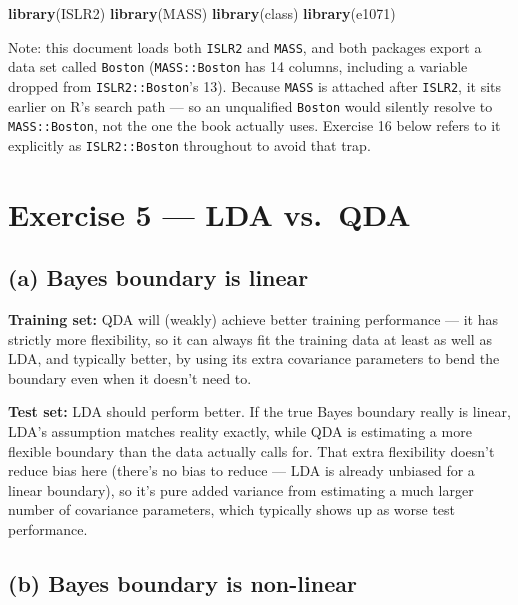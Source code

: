 \documentclass[
  11pt,
]{article}
\author{}
\date{\vspace{-2.5em}}
\newenvironment{Shaded}{\begin{snugshade}}{\end{snugshade}}
\newcommand{\FunctionTok}[1]{\textcolor[rgb]{0.13,0.29,0.53}{\textbf{#1}}}
\newcommand{\NormalTok}[1]{#1}
\begin{document}

\begin{Shaded}
\begin{Highlighting}[]
\FunctionTok{library}\NormalTok{(ISLR2)}
\FunctionTok{library}\NormalTok{(MASS)}
\FunctionTok{library}\NormalTok{(class)}
\FunctionTok{library}\NormalTok{(e1071)}
\end{Highlighting}
\end{Shaded}

Note: this document loads both \texttt{ISLR2} and \texttt{MASS}, and
both packages export a data set called \texttt{Boston}
(\texttt{MASS::Boston} has 14 columns, including a variable dropped from
\texttt{ISLR2::Boston}'s 13). Because \texttt{MASS} is attached after
\texttt{ISLR2}, it sits earlier on R's search path --- so an unqualified
\texttt{Boston} would silently resolve to \texttt{MASS::Boston}, not the
one the book actually uses. Exercise 16 below refers to it explicitly as
\texttt{ISLR2::Boston} throughout to avoid that trap.

\section{Exercise 5 --- LDA vs.~QDA}\label{exercise-5-lda-vs.-qda}

\subsection{(a) Bayes boundary is
linear}\label{a-bayes-boundary-is-linear}

\textbf{Training set:} QDA will (weakly) achieve better training
performance --- it has strictly more flexibility, so it can always fit
the training data at least as well as LDA, and typically better, by
using its extra covariance parameters to bend the boundary even when it
doesn't need to.

\textbf{Test set:} LDA should perform better. If the true Bayes boundary
really is linear, LDA's assumption matches reality exactly, while QDA is
estimating a more flexible boundary than the data actually calls for.
That extra flexibility doesn't reduce bias here (there's no bias to
reduce --- LDA is already unbiased for a linear boundary), so it's pure
added variance from estimating a much larger number of covariance
parameters, which typically shows up as worse test performance.

\subsection{(b) Bayes boundary is
non-linear}\label{b-bayes-boundary-is-non-linear}
\end{document}
